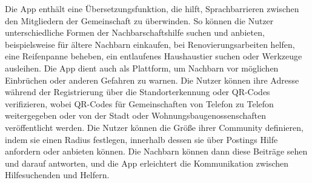 Die App enthält eine Übersetzungsfunktion, die hilft, Sprachbarrieren zwischen den Mitgliedern der Gemeinschaft zu überwinden. So können die Nutzer unterschiedliche Formen der Nachbarschaftshilfe suchen und anbieten, beispielsweise für ältere Nachbarn einkaufen, bei Renovierungsarbeiten helfen, eine Reifenpanne beheben, ein entlaufenes Haushaustier suchen oder Werkzeuge ausleihen. Die App dient auch als Plattform, um Nachbarn vor möglichen Einbrüchen oder anderen Gefahren zu warnen. Die Nutzer können ihre Adresse während der Registrierung über die Standorterkennung oder QR-Codes verifizieren, wobei QR-Codes für Gemeinschaften von Telefon zu Telefon weitergegeben oder von der Stadt oder Wohnungsbaugenossenschaften veröffentlicht werden. Die Nutzer können die Größe ihrer Community definieren, indem sie einen Radius festlegen, innerhalb dessen sie über Postings Hilfe anfordern oder anbieten können. Die Nachbarn können dann diese Beiträge sehen und darauf antworten, und die App erleichtert die Kommunikation zwischen Hilfesuchenden und Helfern.

